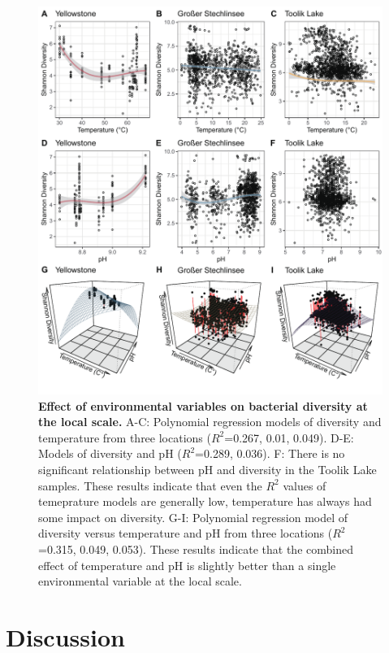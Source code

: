 \documentclass[11pt, a4paper]{article}
\begin{document}
\begin{spacing}{1.5}
\begin{figure}
    \centering
    \includegraphics[scale=0.8]{./Figures/Shan_PM_local_1and2EVs_3D}
    \caption{\textbf{Effect of environmental variables on bacterial diversity at the local scale.} A-C: Polynomial regression models of diversity and temperature from three locations ($R^{2}$=0.267, 0.01, 0.049). D-E: Models of diversity and pH ($R^{2}$=0.289, 0.036). F: There is no significant relationship between pH and diversity in the Toolik Lake samples. These results indicate that even the $R^2$ values of temeprature models are generally low, temperature has always had some impact on diversity. G-I: Polynomial regression model of diversity versus temperature and pH from three locations ($R^{2}$=0.315, 0.049, 0.053). These results indicate that the combined effect of temperature and pH is slightly better than a single environmental variable at the local scale.}
    \label{fig:Shan_PM_local_1and2EVs}
\end{figure}

\section{Discussion}


\end{spacing}
\end{document}

